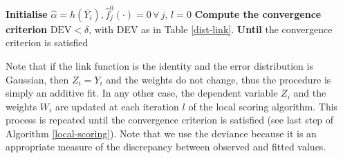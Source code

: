\begin{algorithm}[ht!]
\SetAlgoLined
\caption{Local scoring algorithm}
\label{local-scoring}
\textbf{Initialise} $\hat \alpha = h(\overline{Y_i}), \hat f_j^0 (\cdot) = 0 \, \forall \, j, \, l = 0 $ \BlankLine
{}
    \BlankLine
\textbf{Compute the convergence criterion} $\text{DEV} < \delta$, with DEV as in Table \ref{dist-link}. \BlankLine
\textbf{Until} the convergence criterion is satisfied \BlankLine
\end{algorithm}

Note that if the link function is the identity and the error distribution is Gaussian,  then $Z_i = Y_i$ and the weights do not change, thus the procedure is simply an additive fit. In any other case, the dependent variable $Z_i$ and the weights $W_i$ are updated at each iteration $l$  of the local scoring algorithm. This process is repeated until the convergence criterion is satisfied (see last step of Algorithm \ref{local-scoring}). Note that we use the deviance because it is an appropriate measure of the discrepancy between observed and fitted values. 

